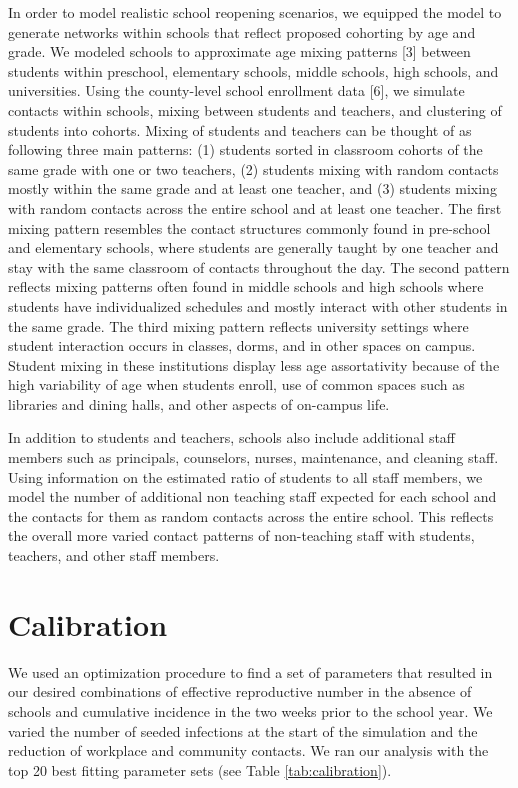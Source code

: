 \documentclass[preprint,12pt]{elsarticle}
\begin{document}
In order to model realistic school reopening scenarios, we equipped the model to generate networks within schools that reflect proposed cohorting by age and grade. We modeled schools to approximate age mixing patterns [3] between students within preschool, elementary schools, middle schools, high schools, and universities.  Using the county-level school enrollment data [6], we simulate contacts within schools, mixing between students and teachers, and clustering of students into cohorts. Mixing of students and teachers can be thought of as following three main patterns: (1) students sorted in classroom cohorts of the same grade with one or two teachers, (2) students mixing with random contacts mostly within the same grade and at least one teacher, and (3) students mixing with random contacts across the entire school and at least one teacher. The first mixing pattern resembles the contact structures commonly found in pre-school and elementary schools, where students are generally taught by one teacher and stay with the same classroom of contacts throughout the day. The second pattern reflects mixing patterns often found in middle schools and high schools where students have individualized schedules and mostly interact with other students in the same grade. The third mixing pattern reflects university settings where student interaction occurs in classes, dorms, and in other spaces on campus. Student mixing in these institutions display less age assortativity because of the high variability of age when students enroll, use of common spaces such as libraries and dining halls, and other aspects of on-campus life. 

In addition to students and teachers, schools also include additional staff members such as principals, counselors, nurses, maintenance, and cleaning staff. Using information on the estimated ratio of students to all staff members, we model the number of additional non teaching staff expected for each school and the contacts for them as random contacts across the entire school. This reflects the overall more varied contact patterns of non-teaching staff with students, teachers, and other staff members.

\section{Calibration}
\label{sec:AppendixB}

We used an optimization procedure to find a set of parameters that resulted in our desired combinations of effective reproductive number in the absence of schools and cumulative incidence in the two weeks prior to the school year. We varied the number of seeded infections at the start of the simulation and the reduction of workplace and community contacts. We ran our analysis with the top 20 best fitting parameter sets (see Table \ref{tab:calibration}).
\end{document}
